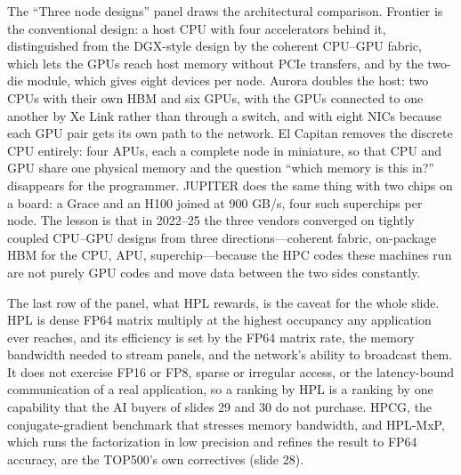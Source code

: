 \documentclass[11pt,letterpaper]{article}
\begin{document}
The ``Three node designs'' panel draws the architectural comparison. Frontier is the conventional design: a host CPU with four accelerators behind it, distinguished from the DGX-style design by the coherent CPU--GPU fabric, which lets the GPUs reach host memory without PCIe transfers, and by the two-die module, which gives eight devices per node. Aurora doubles the host: two CPUs with their own HBM and six GPUs, with the GPUs connected to one another by Xe Link rather than through a switch, and with eight NICs because each GPU pair gets its own path to the network. El Capitan removes the discrete CPU entirely: four APUs, each a complete node in miniature, so that CPU and GPU share one physical memory and the question ``which memory is this in?'' disappears for the programmer. JUPITER does the same thing with two chips on a board: a Grace and an H100 joined at 900 GB/s, four such superchips per node. The lesson is that in 2022--25 the three vendors converged on tightly coupled CPU--GPU designs from three directions---coherent fabric, on-package HBM for the CPU, APU, superchip---because the HPC codes these machines run are not purely GPU codes and move data between the two sides constantly.

The last row of the panel, what HPL rewards, is the caveat for the whole slide. HPL is dense FP64 matrix multiply at the highest occupancy any application ever reaches, and its efficiency is set by the FP64 matrix rate, the memory bandwidth needed to stream panels, and the network's ability to broadcast them. It does not exercise FP16 or FP8, sparse or irregular access, or the latency-bound communication of a real application, so a ranking by HPL is a ranking by one capability that the AI buyers of slides 29 and 30 do not purchase. HPCG, the conjugate-gradient benchmark that stresses memory bandwidth, and HPL-MxP, which runs the factorization in low precision and refines the result to FP64 accuracy, are the TOP500's own correctives (slide 28).
\end{document}
